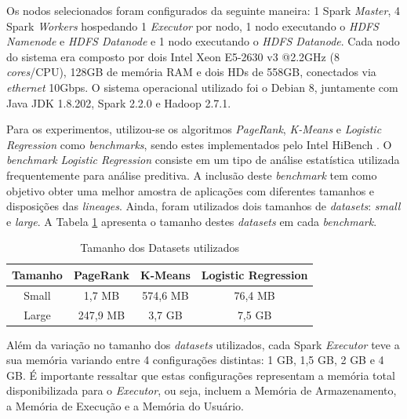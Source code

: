 Os nodos selecionados foram configurados da seguinte maneira: 1 Spark \textit{Master}, 4 Spark \textit{Workers} hospedando 1 \textit{Executor} por nodo, 1 nodo executando o \textit{HDFS Namenode} e \textit{HDFS Datanode} e 1 nodo executando o \textit{HDFS Datanode}. Cada nodo do sistema era composto por dois Intel Xeon E5-2630 v3 @2.2GHz (8 \textit{cores}/CPU), 128GB de memória RAM e dois HDs de 558GB, conectados via \textit{ethernet} 10Gbps. O sistema operacional utilizado foi o Debian 8, juntamente com Java JDK 1.8.202, Spark 2.2.0 e Hadoop 2.7.1. 

Para os experimentos, utilizou-se os algoritmos \textit{PageRank}, \textit{K-Means} e \textit{Logistic Regression} como \textit{benchmarks}, sendo estes implementados pelo Intel HiBench \cite{huang2010hibench}. O \textit{benchmark Logistic Regression} consiste em um tipo de análise estatística utilizada frequentemente para análise preditiva. A inclusão deste \textit{benchmark} tem como objetivo obter uma melhor amostra de aplicações com diferentes tamanhos e disposições das \textit{lineages}. Ainda, foram utilizados dois tamanhos de \textit{datasets}: \textit{small} e \textit{large}. A Tabela \ref{tab:tamanho-datasets} apresenta o tamanho destes \textit{datasets} em cada \textit{benchmark}.

\begin{table}[!ht]
    \centering
        \caption{Tamanho dos Datasets utilizados}
        \label{tab:tamanho-datasets}
            \begin{tabular}{cccc}
                \hline
                Tamanho & PageRank & K-Means & Logistic Regression \\ \hline
                Small & 1,7 MB & 574,6 MB & 76,4 MB \\
                Large & 247,9 MB & 3,7 GB & 7,5 GB \\ \hline
        \end{tabular}
\end{table}

Além da variação no tamanho dos \textit{datasets} utilizados, cada Spark \textit{Executor} teve a sua memória variando entre 4 configurações distintas: 1 GB, 1,5 GB, 2 GB e 4 GB. É importante ressaltar que estas configurações representam a memória total disponibilizada para o \textit{Executor}, ou seja, incluem a Memória de Armazenamento, a Memória de Execução e a Memória do Usuário.

